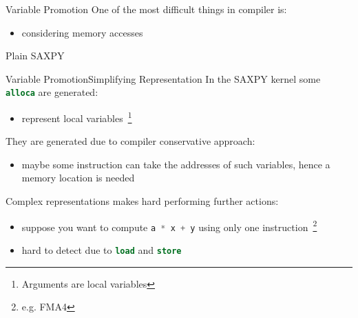\documentclass[10pt,mathserif]{beamer}
\newcommand{\cinline}[1]{\lstinline[language=C]!#1!}
\newcommand{\llvminput}[1]{}
\newcommand{\llvminline}[1]{\lstinline[language=LLVM]!#1!}
\begin{document}
\begin{frame}{Variable Promotion}
One of the most difficult things in compiler is:

\begin{itemize}
\item considering memory accesses
\end{itemize}

\vfill
\begin{block}{Plain SAXPY}
\centering
\llvminput{snippet/02/plain-saxpy.ll}
\end{block}
\end{frame}

\begin{frame}{Variable Promotion}{Simplifying Representation}
In the SAXPY kernel some \llvminline{alloca} are generated:

\begin{itemize}
\item represent \alert{local variables}~\footnote{Arguments are local variables}
\end{itemize}

\vfill
They are generated due to compiler \alert{conservative} approach:

\begin{itemize}
\item maybe some instruction can take the addresses of such variables, hence a
      memory location is needed
\end{itemize}

\vfill
Complex representations makes hard performing further actions:

\begin{itemize}
\item suppose you want to compute \cinline{a * x + y} using only one
      instruction~\footnote{e.g. FMA4}
\item hard to detect due to \llvminline{load} and \llvminline{store}
\end{itemize}
\end{frame}
\end{document}
